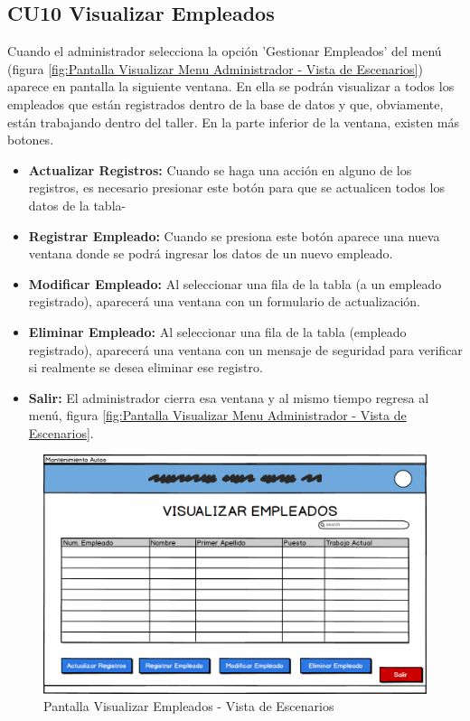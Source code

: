 \subsection{CU10 Visualizar Empleados}
Cuando el administrador selecciona la opción 'Gestionar Empleados' del menú (figura \ref{fig:Pantalla Visualizar Menu Administrador - Vista de Escenarios}) aparece en pantalla la siguiente ventana. En ella se podrán visualizar a todos los empleados que están registrados dentro de la base de datos y que, obviamente, están trabajando dentro del taller. En la parte inferior de la ventana, existen más botones.
\begin{itemize}
	\item \textbf{Actualizar Registros:} Cuando se haga una acción en alguno de los registros, es necesario presionar este botón para que se actualicen todos los datos de la tabla-
	\item \textbf{Registrar Empleado:} Cuando se presiona este botón aparece una nueva ventana donde se podrá ingresar los datos de un nuevo empleado.
	\item \textbf{Modificar Empleado:} Al seleccionar una fila de la tabla (a un empleado registrado), aparecerá una ventana con un formulario de actualización.
	\item \textbf{Eliminar Empleado:} Al seleccionar una fila de la tabla (empleado registrado), aparecerá una ventana con un mensaje de seguridad para verificar si realmente se desea eliminar ese registro.
	\item \textbf{Salir:} El administrador cierra esa ventana y al mismo tiempo regresa al menú, figura \ref{fig:Pantalla Visualizar Menu Administrador - Vista de Escenarios}.
\end{itemize}
\begin{figure}[!h]
	\centering
	\includegraphics[width=1\textwidth]{./diseno/vescenarios/imagenes/VisualizarEmpleados}
	\caption{Pantalla Visualizar Empleados - Vista de Escenarios}
	\label{fig:Pantalla Visualizar Empleados - Vista de Escenarios}
\end{figure}
